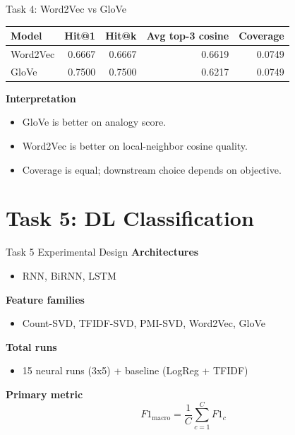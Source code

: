 \documentclass{beamer}
\newcommand{\fmacro}{F1_{\text{macro}}}
\begin{document}
\begin{frame}{Task 4: Word2Vec vs GloVe}
\small
\begin{table}
\centering
\begin{tabular}{lrrrr}
\toprule
Model & Hit@1 & Hit@k & Avg top-3 cosine & Coverage \\
\midrule
Word2Vec & 0.6667 & 0.6667 & 0.6619 & 0.0749 \\
GloVe & 0.7500 & 0.7500 & 0.6217 & 0.0749 \\
\bottomrule
\end{tabular}
\end{table}

\vspace{0.3em}
\textbf{Interpretation}
\begin{itemize}
  \item GloVe is better on analogy score.
  \item Word2Vec is better on local-neighbor cosine quality.
  \item Coverage is equal; downstream choice depends on objective.
\end{itemize}
\end{frame}

\section{Task 5: DL Classification}

\begin{frame}{Task 5 Experimental Design}
\small
\textbf{Architectures}
\begin{itemize}
  \item RNN, BiRNN, LSTM
\end{itemize}

\textbf{Feature families}
\begin{itemize}
  \item Count-SVD, TFIDF-SVD, PMI-SVD, Word2Vec, GloVe
\end{itemize}

\textbf{Total runs}
\begin{itemize}
  \item 15 neural runs (3x5) + baseline (LogReg + TFIDF)
\end{itemize}

\textbf{Primary metric}
\[
\fmacro = \frac{1}{C}\sum_{c=1}^{C}F1_c
\]
\end{frame}
\end{document}
